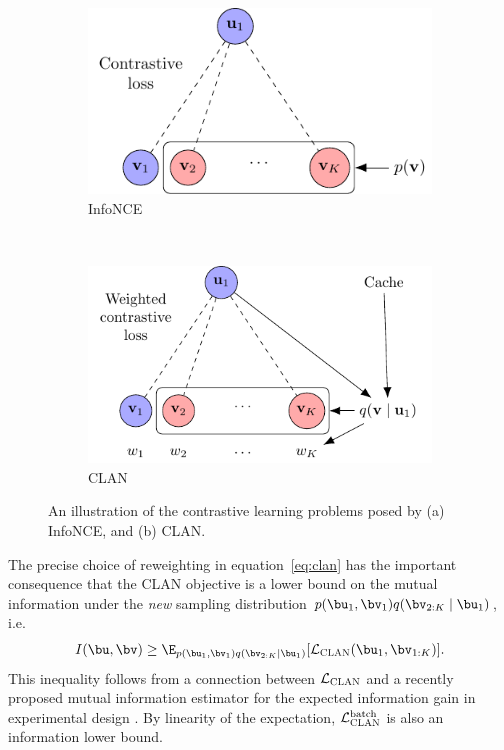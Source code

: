 \begin{figure}[t]
	\centering
	\begin{subfigure}[t]{0.45\textwidth}
		\centering
		\vskip 0pt
		\includegraphics[scale=1]{figures/infonce_diagram.pdf}
		\vspace{10pt}
		\caption{InfoNCE \label{fig:diagram:infonce}}
	\end{subfigure}
	~
	\begin{subfigure}[t]{0.45\textwidth}
		\centering
		\vskip 0pt
		\includegraphics[scale=1]{figures/clan_diagram.pdf}
		\caption{CLAN \label{fig:diagram:clan}}
	\end{subfigure}
	\caption{An illustration of the contrastive learning problems posed by (a) InfoNCE, and (b) CLAN. }
	\vspace{-5pt}
	\label{fig:diagrams}
\end{figure}


The precise choice of reweighting in equation~\eqref{eq:clan} has the important consequence that the CLAN objective is a lower bound on the mutual information under the \textit{new} sampling distribution $p(\bu_1, \bv_1)q(\bv_{2:K}\mid \bu_1)$, i.e.
\begin{equation}
\label{eq:clan_lb}
I(\bu,\bv) \ge \E_{p(\bu_1, \bv_1)q(\bv_{2:K}\mid \bu_1)}[\mathcal{L}_\textsc{CLAN}(\bu_1,\bv_{1:K})].
\end{equation}
This inequality follows from a connection between $\mathcal{L}_\textsc{CLAN}$ and a recently proposed mutual information estimator for the expected information gain in experimental design \cite{foster2019unified}. By linearity of the expectation, $\mathcal{L}_\textsc{CLAN}^\text{batch}$ is also an information lower bound. 

